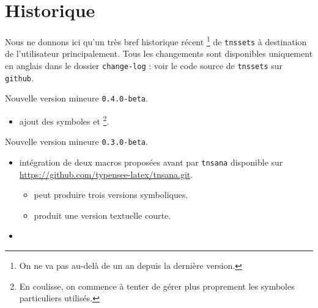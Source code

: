 \documentclass[12pt,a4paper]{article}
\begin{document}
\newpage

\section{Historique}

Nous ne donnons ici qu'un très bref historique récent
\footnote{
	On ne va pas au-delà de un an depuis la dernière version.
}
de \verb+tnssets+ à destination de l'utilisateur principalement.
Tous les changements sont disponibles uniquement en anglais dans le dossier \verb+change-log+ : voir le code source de \verb+tnssets+ sur \verb+github+.

\begin{description}

    \medskip
    \item[2021-03-02] Nouvelle version mineure \verb+0.4.0-beta+.
    
    \begin{itemize}[itemsep=.5em]
        \item {}
              ajout des symboles  et  
              \footnote{
              	En coulisse, on commence à tenter de gérer plus proprement les symboles particuliers utilisés.
    		  }.
    \end{itemize}
    
    \separation

    \medskip
    \item[2020-08-05] Nouvelle version mineure \verb+0.3.0-beta+.
    
    \begin{itemize}[itemsep=.5em]
        \item {}
              intégration de deux macros proposées avant par \verb#tnsana# disponible sur \url{https://github.com/typensee-latex/tnsana.git}.
    
        \begin{itemize}[itemsep=.5em]
            \item {} peut produire trois versions symboliques.
    
            \item {} produit une version textuelle courte.
        \end{itemize}
    
    
        \item {}
    

\end{itemize}
\end{description}
\end{document}

